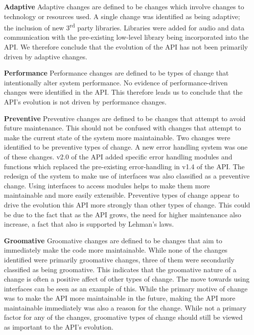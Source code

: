 \documentclass{sig-alternate}
\begin{document}
\smallskip \noindent
\textbf{Adaptive  }
Adaptive changes are defined to be changes which involve changes to technology or resources used. 
A single change was identified as being adaptive; the inclusion of new 3\textsuperscript{rd} party libraries. Libraries were added for audio and data communication with the pre-existing low-level library being incorporated into the API.
We therefore conclude that the evolution of the API has not been primarily driven by adaptive changes.

\smallskip \noindent
\textbf{Performance  }
Performance changes are defined to be types of change that intentionally alter system performance.
No evidence of performance-driven changes were identified in the API.
This therefore leads us to conclude that the API's evolution is not driven by performance changes.

\smallskip \noindent
\textbf{Preventive  }
Preventive changes are defined to be changes that attempt to avoid future maintenance. This should not be confused with changes that attempt to make the current state of the system more maintainable.
Two changes were identified to be preventive types of change. A new error handling system was one of these changes. v2.0 of the API added specific error handling modules and functions which replaced the pre-existing error-handling in v1.4 of the API. The redesign of the system to make use of interfaces was also classified as a preventive change. Using interfaces to access modules helps to make them more maintainable and more easily extensible.
Preventive types of change appear to drive the evolution this API more strongly than other types of change. This could be due to the fact that as the API grows, the need for higher maintenance also increase, a fact that also is supported by Lehman's laws.

\smallskip \noindent
\textbf{Groomative  }
Groomative changes are defined to be changes that aim to immediately make the code more maintainable.
While none of the changes identified were primarily groomative changes, three of them were secondarily classified as being groomative. This indicates that the groomative nature of a change is often a positive affect of other types of change. The move towards using interfaces can be seen as an example of this. While the primary motive of change was to make the API more maintainable in the future, making the API more maintainable immediately was also a reason for the change.
While not a primary factor for any of the changes, groomative types of change should still be viewed as important to the API's evolution.
\end{document}
